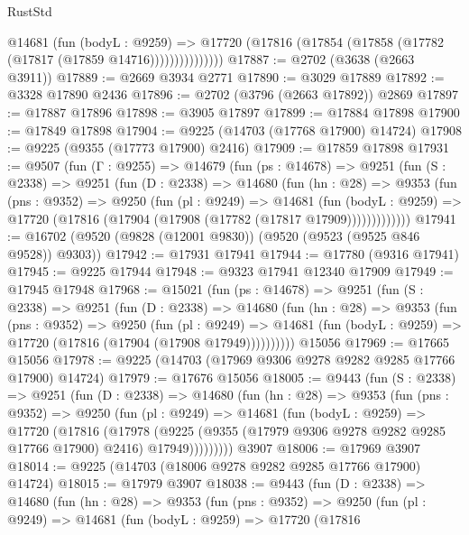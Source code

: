 \begin{lexlean}{RustStd}
\begin{coremodule}
                  @14681
                    (fun (bodyL : @9259) =>
                    @17720 (@17816 (@17854 (@17858 (@17782 (@17817 (@17859 @14716)))))))))))))))
@17887 := @2702 (@3638 (@2663 @3911))
@17889 := @2669 @3934 @2771
@17890 := @3029 @17889
@17892 := @3328 @17890 @2436
@17896 := @2702 (@3796 (@2663 @17892)) @2869
@17897 := @17887 @17896
@17898 := @3905 @17897
@17899 := @17884 @17898
@17900 := @17849 @17898
@17904 := @9225 (@14703 (@17768 @17900) @14724)
@17908 := @9225 (@9355 (@17773 @17900) @2416)
@17909 := @17859 @17898
@17931 := @9507
    (fun (Γ : @9255) =>
    @14679
      (fun (ps : @14678) =>
      @9251
        (fun (S : @2338) =>
        @9251
          (fun (D : @2338) =>
          @14680
            (fun (hn : @28) =>
            @9353
              (fun (pns : @9352) =>
              @9250
                (fun (pl : @9249) =>
                @14681
                  (fun (bodyL : @9259) =>
                  @17720 (@17816 (@17904 (@17908 (@17782 (@17817 @17909)))))))))))))
@17941 := @16702 (@9520 (@9828 (@12001 @9830)) (@9520 (@9523 (@9525 @846 @9528)) @9303))
@17942 := @17931 @17941
@17944 := @17780 (@9316 @17941)
@17945 := @9225 @17944
@17948 := @9323 @17941 @12340 @17909
@17949 := @17945 @17948
@17968 := @15021
    (fun (ps : @14678) =>
    @9251
      (fun (S : @2338) =>
      @9251
        (fun (D : @2338) =>
        @14680
          (fun (hn : @28) =>
          @9353
            (fun (pns : @9352) =>
            @9250
              (fun (pl : @9249) =>
              @14681 (fun (bodyL : @9259) => @17720 (@17816 (@17904 (@17908 @17949))))))))))
    @15056
@17969 := @17665 @15056
@17978 := @9225 (@14703 (@17969 @9306 @9278 @9282 @9285 @17766 @17900) @14724)
@17979 := @17676 @15056
@18005 := @9443
    (fun (S : @2338) =>
    @9251
      (fun (D : @2338) =>
      @14680
        (fun (hn : @28) =>
        @9353
          (fun (pns : @9352) =>
          @9250
            (fun (pl : @9249) =>
            @14681
              (fun (bodyL : @9259) =>
              @17720
                (@17816
                  (@17978
                    (@9225
                      (@9355 (@17979 @9306 @9278 @9282 @9285 @17766 @17900) @2416)
                      @17949)))))))))
    @3907
@18006 := @17969 @3907
@18014 := @9225 (@14703 (@18006 @9278 @9282 @9285 @17766 @17900) @14724)
@18015 := @17979 @3907
@18038 := @9443
    (fun (D : @2338) =>
    @14680
      (fun (hn : @28) =>
      @9353
        (fun (pns : @9352) =>
        @9250
          (fun (pl : @9249) =>
          @14681
            (fun (bodyL : @9259) =>
            @17720
              (@17816

\end{coremodule}
\end{lexlean}
